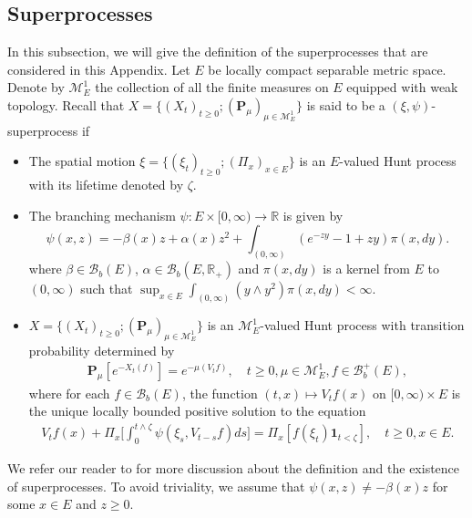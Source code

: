 \documentclass[12pt]{amsart}
\theoremstyle{plain}
\theoremstyle{definition}
\numberwithin{equation}{section}
\begin{document}
\subsection{Superprocesses}
\label{sec: definition of superprocess}
    In this subsection, we will give the definition of the superprocesses that are considered in this Appendix.
Let $E$ be locally compact separable metric space. Denote by $\mathcal M_E^1$ the collection of all the finite measures on $E$ equipped with weak topology.
    Recall that $X=\{(X_t)_{t\geq 0}; (\mathbf P_\mu)_{\mu \in \mathcal M^1_E}\}$ is said to be a $(\xi,\psi)$-superprocess if
\begin{itemize}
\item
    The spatial motion $\xi=\{(\xi_t)_{t\geq 0};(\Pi_x)_{x\in E}\}$ is an $E$-valued Hunt process with its lifetime denoted by $\zeta$.
\item
    The branching mechanism $\psi: E\times[0,\infty) \to \mathbb R$ is given by
\begin{equation}
\label{eq: branching mechanism}
    \psi(x,z)=
    - \beta(x) z + \alpha (x) z^2 + \int_{(0,\infty)} (e^{-zy} - 1 + zy) \pi(x,dy).
\end{equation}
    where $\beta \in \mathcal B_b(E)$, $\alpha \in \mathcal B_b(E, \mathbb R_+)$ and $\pi(x,dy)$ is a kernel from $E$ to $(0,\infty)$ such that $\sup_{x\in E} \int_{(0,\infty)} (y\wedge y^2) \pi(x,dy) < \infty$.
\item
    $X=\{(X_t)_{t\geq 0}; (\mathbf P_\mu)_{\mu \in \mathcal M^1_E}\}$ is an $\mathcal M^1_E$-valued Hunt process with transition probability determined by
\begin{align}
    \mathbf P_\mu [e^{-X_t(f)}] = e^{-\mu(V_tf)},
    \quad t\geq 0, \mu \in \mathcal M_E^1, f\in \mathscr B^+_b(E),
\end{align}
    where for each $f\in \mathcal B_b(E)$, the function $(t,x)\mapsto V_tf(x)$ on $[0,\infty) \times E$ is the unique locally bounded positive solution to the equation
\begin{align}\label{eq:FKPP_in_definition}
    V_tf(x) + \Pi_x \Big[  \int_0^{t\wedge \zeta} \psi(\xi_s,V_{t-s}f)ds \Big]
    = \Pi_x [ f(\xi_t)\mathbf 1_{t<\zeta} ],
    \quad t \geq 0, x \in E.
\end{align}
\end{itemize}
    We refer our reader to \cite{Li2011Measure-valued} for more discussion about the definition and the existence of superprocesses.
    To avoid triviality, we assume that $\psi(x,z)\neq -\beta(x)z$ for some $x \in E$ and $z \geq 0$.
\end{document}
